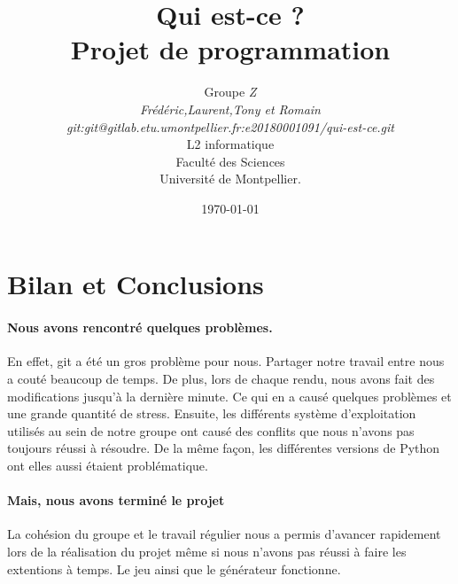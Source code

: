 \documentclass[a4paper]{article}
\title{  Qui est-ce ?\\         %
  Projet de programmation}
\author{Groupe \emph{Z}\\
  \emph{Frédéric,Laurent,Tony et Romain}\\
  \emph{git:git@gitlab.etu.umontpellier.fr:e20180001091/qui-est-ce.git}\\
  L2 informatique\\
  Faculté des Sciences\\
Université de Montpellier.}
\date{\today}
\begin{document}
\maketitle                    %

   
 
\section{Bilan et Conclusions}

\paragraph{Nous avons rencontré quelques problèmes.}
En effet, git a été un gros problème pour nous. Partager notre travail entre nous a couté beaucoup de temps. De plus, lors de chaque rendu, nous avons fait des modifications jusqu'à la dernière minute. Ce qui en a causé quelques problèmes et une grande quantité de stress.
Ensuite, les différents système d'exploitation utilisés au sein de notre groupe ont causé des conflits que nous n'avons pas toujours réussi à résoudre.
De la même façon, les différentes versions de Python ont elles aussi étaient problématique.

\paragraph{Mais, nous avons terminé le projet}
La cohésion du groupe et le travail régulier nous a permis d'avancer rapidement lors de la réalisation du projet même si nous n'avons pas réussi à faire les extentions à temps.
Le jeu ainsi que le générateur fonctionne.
\end{document}
